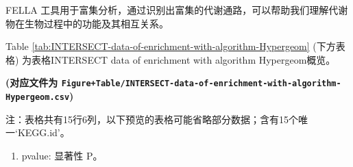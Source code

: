 \documentclass[
]{article}
\providecommand{\tightlist}{%
  \setlength{\itemsep}{0pt}\setlength{\parskip}{0pt}}
\begin{document}
FELLA 工具用于富集分析，通过识别出富集的代谢通路，可以帮助我们理解代谢物在生物过程中的功能及其相互关系。

\begin{center}\vspace{1.5cm}\end{center}

Table \ref{tab:INTERSECT-data-of-enrichment-with-algorithm-Hypergeom} (下方表格) 为表格INTERSECT data of enrichment with algorithm Hypergeom概览。

\textbf{(对应文件为 \texttt{Figure+Table/INTERSECT-data-of-enrichment-with-algorithm-Hypergeom.csv})}

\begin{center}\begin{tcolorbox}[colback=gray!10, colframe=gray!50, width=0.9\linewidth, arc=1mm, boxrule=0.5pt]注：表格共有15行6列，以下预览的表格可能省略部分数据；含有15个唯一`KEGG.id'。
\end{tcolorbox}
\end{center}
\begin{center}\begin{tcolorbox}[colback=gray!10, colframe=gray!50, width=0.9\linewidth, arc=1mm, boxrule=0.5pt]\begin{enumerate}\tightlist
\item pvalue:  显著性 P。
\end{enumerate}\end{tcolorbox}
\end{center}
\end{document}
